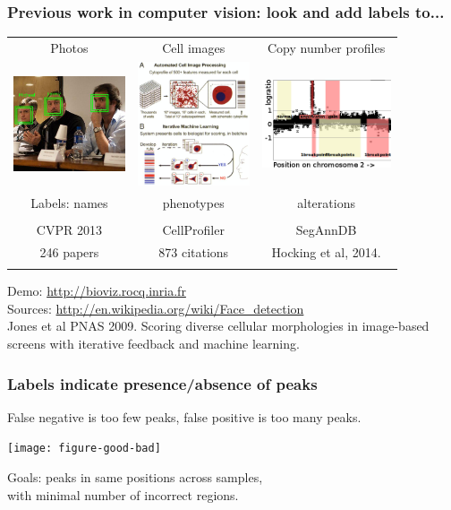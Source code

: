 \documentclass{beamer}
\begin{document}
\begin{frame}
  \frametitle{Previous work in computer vision: look and add labels
    to...}
  \begin{tabular}{ccc}
    Photos & Cell images & Copy number profiles \\
    \includegraphics[width=1.3in]{faces} &
    \includegraphics[width=1.3in]{cellprofiler} &
    \includegraphics[width=1.5in]{regions-axes}\\
    Labels: names & phenotypes & alterations \\ \\
    CVPR 2013 & CellProfiler & SegAnnDB \\
    246 papers & 873 citations & Hocking et al, 2014. \\
     &
  \end{tabular}
  Demo: \url{http://bioviz.rocq.inria.fr}\\
  Sources: \url{http://en.wikipedia.org/wiki/Face_detection}\\
  Jones et al PNAS 2009. Scoring diverse cellular morphologies in
  image-based screens with iterative feedback and machine learning.
\end{frame}

\begin{frame}
  \frametitle{Labels indicate presence/absence of peaks}

  False negative is too few peaks, false positive is too many peaks.

  \texttt{[image: figure-good-bad]}

  Goals: peaks in same positions across samples,\\
  with minimal number of incorrect regions.

\end{frame}
\end{document}
